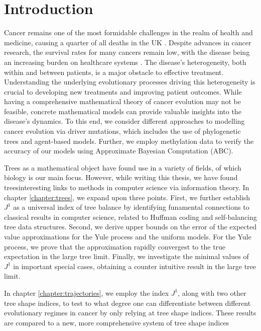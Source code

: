 \chapter{Introduction}\label{chapter:introduction}
Cancer remains one of the most formidable challenges in the realm of health and medicine, causing a quarter of all deaths in the UK \cite{noauthor_cancer_2015}.
Despite advances in cancer research, the survival rates for many cancers remain low, with the disease being an increasing burden on healthcare
systems \cite{noauthor_financial_nodate}. The disease's heterogeneity, both within and between patients, is a major obstacle to effective treatment. Understanding the
underlying evolutionary processes driving this heterogeneity is crucial to developing new treatments and improving patient outcomes.
While having a comprehensive mathematical theory of cancer evolution may not be feasible, concrete mathematical models can provide valuable insights into the
disease's dynamics. To this end, we consider different approaches to modelling cancer evolution via driver mutations, which includes the use of phylogenetic
trees and agent-based models. Further, we employ methylation data to verify the accuracy of our models using Approximate Bayesian Computation (ABC).\par
Trees as a mathematical object have found use in a variety of fields, of which biology is our main focus. However, while writing this thesis, we have found
treesinteresting links to methods in computer science via information theory.
In chapter \ref{chapter:trees}, we expand upon three points. First, we further establish $J^1$ as a
universal index of tree balance by identifying funamental connections to classical results in
computer science, related to Huffman coding and self-balancing tree data structures. Second, we derive
upper bounds on the error of the expected value approximations for the Yule process and the uniform models.
For the Yule process, we prove that the approximation rapidly convergest to the true expectation in the
large tree limit. Finally, we investigate the minimal values of $J^1$ in important special cases,
obtaining a counter intuitive result in the large tree limit.\par
In chapter \ref{chapter:trajectories}, we employ the index $J^1$, along with two other tree shape indices, to
test to what degree one can differentiate between different evolutionary regimes in cancer by only relying at
tree shape indices. These results are compared to a new, more comprehensive system of tree shape indices \cite{noble_new_2023}
